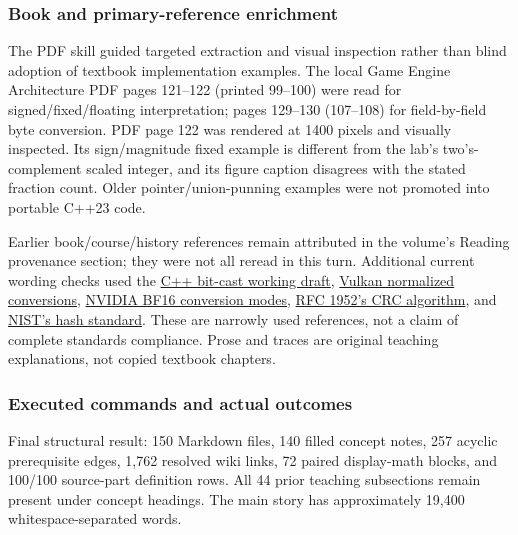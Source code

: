 \subsubsection{Book and primary-reference enrichment}\label{appendix-a103e7846d21-book-and-primary-reference-enrichment}

The PDF skill guided targeted extraction and visual inspection rather than blind adoption of textbook implementation examples. The local Game Engine Architecture PDF pages 121--122 (printed 99--100) were read for signed/fixed/floating interpretation; pages 129--130 (107--108) for field-by-field byte conversion. PDF page 122 was rendered at 1400 pixels and visually inspected. Its sign/magnitude fixed example is different from the lab's two's-complement scaled integer, and its figure caption disagrees with the stated fraction count. Older pointer/union-punning examples were not promoted into portable C++23 code.

Earlier book/course/history references remain attributed in the volume's Reading provenance section; they were not all reread in this turn. Additional current wording checks used the \href{https://eel.is/c++draft/bit.cast}{C++ bit-cast working draft}, \href{https://docs.vulkan.org/spec/latest/chapters/fundamentals.html\#fundamentals-fixedfpconv}{Vulkan normalized conversions}, \href{https://docs.nvidia.com/cuda/cuda-math-api/cuda_math_api/group__CUDA__MATH____BFLOAT16__MISC.html}{NVIDIA BF16 conversion modes}, \href{https://www.rfc-editor.org/rfc/rfc1952\#section-8}{RFC 1952's CRC algorithm}, and \href{https://csrc.nist.gov/pubs/fips/180-4/upd1/final}{NIST's hash standard}. These are narrowly used references, not a claim of complete standards compliance. Prose and traces are original teaching explanations, not copied textbook chapters.

\subsubsection{Executed commands and actual outcomes}\label{appendix-a103e7846d21-executed-commands-and-actual-outcomes}

Final structural result: 150 Markdown files, 140 filled concept notes, 257 acyclic prerequisite edges, 1,762 resolved wiki links, 72 paired display-math blocks, and 100/100 source-part definition rows. All 44 prior teaching subsections remain present under concept headings. The main story has approximately 19,400 whitespace-separated words.

